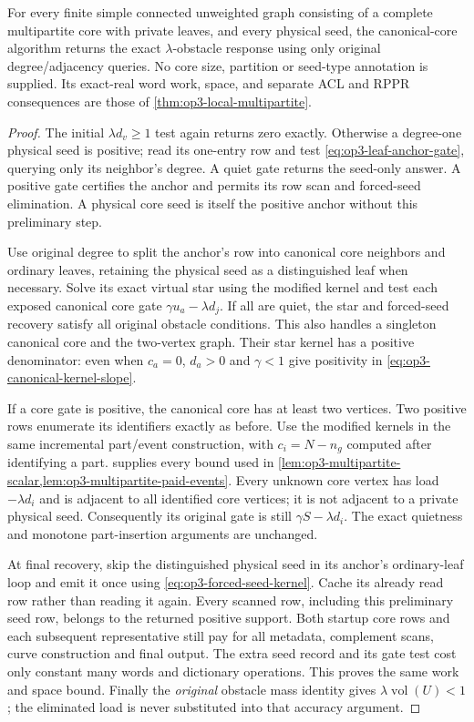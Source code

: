 \begin{theorem}
\label{thm:op3-canonical-multipartite}
For every finite simple connected unweighted graph consisting of a
complete multipartite core with private leaves, and every physical seed,
the canonical-core algorithm returns the exact $\lambda$-obstacle response
using only original degree/adjacency queries. No core size, partition or
seed-type annotation is supplied. Its exact-real word work, space, and
separate ACL and RPPR consequences are those of
\cref{thm:op3-local-multipartite}.
\end{theorem}
\begin{proof}
The initial $\lambda d_v\geq1$ test again returns zero exactly. Otherwise
a degree-one physical seed is positive; read its one-entry row and test
\cref{eq:op3-leaf-anchor-gate}, querying only its neighbor's degree.
A quiet gate returns the seed-only answer. A positive gate certifies the
anchor and permits its row scan and forced-seed elimination. A physical
core seed is itself the positive anchor without this preliminary step.

Use original degree to split the anchor's row into canonical core neighbors
and ordinary leaves, retaining the physical seed as a distinguished leaf
when necessary. Solve its exact virtual star using the modified kernel and
test each exposed canonical core gate $\gamma u_a-\lambda d_j$.
If all are quiet, the star and forced-seed recovery satisfy all original
obstacle conditions. This also handles a singleton canonical core and the
two-vertex graph. Their star kernel has a positive denominator: even when
$c_a=0$, $d_a>0$ and $\gamma<1$ give positivity in
\cref{eq:op3-canonical-kernel-slope}.

If a core gate is positive, the canonical core has at least two vertices.
Two positive rows enumerate its identifiers exactly as before. Use the
modified kernels in the same incremental part/event construction, with
$c_i=N-n_g$ computed after identifying a part.
 supplies every bound used in
\cref{lem:op3-multipartite-scalar,lem:op3-multipartite-paid-events}.
Every unknown core vertex has load $-\lambda d_i$ and is adjacent to all
identified core vertices; it is not adjacent to a private physical seed.
Consequently its original gate is still $\gamma S-\lambda d_i$.
The exact quietness and monotone part-insertion arguments are unchanged.

At final recovery, skip the distinguished physical seed in its anchor's
ordinary-leaf loop and emit it once using
\cref{eq:op3-forced-seed-kernel}. Cache its already read row rather than
reading it again. Every scanned row, including this preliminary seed row,
belongs to the returned positive support. Both startup core rows and each
subsequent representative still pay for all metadata, complement scans,
curve construction and final output. The extra seed record and its gate
test cost only constant many words and dictionary operations. This proves
the same work and space bound. Finally the \emph{original} obstacle mass
identity gives $\lambda\operatorname{vol}(U)<1$; the eliminated load is
never substituted into that accuracy argument.
\end{proof}

